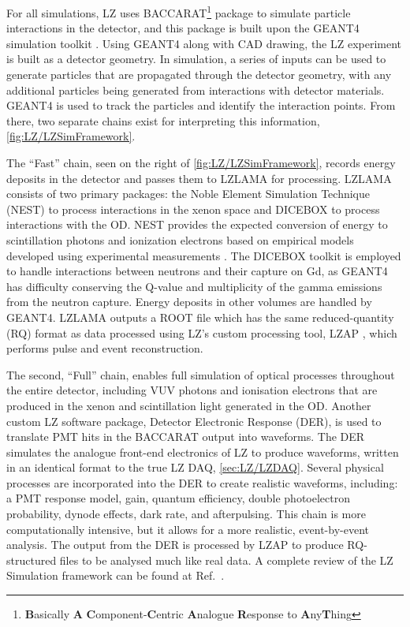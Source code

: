 For all simulations, LZ uses BACCARAT\footnote{\textbf{B}asically \textbf{A} \textbf{C}omponent-\textbf{C}entric \textbf{A}nalogue \textbf{R}esponse to \textbf{A}ny\textbf{T}hing}\cite{LZ_SIMS} package to simulate particle interactions in the detector, and this package is built upon the GEANT4 simulation toolkit \cite{GEANT4:2002zbu}. Using GEANT4 along with CAD drawing, the LZ experiment is built as a detector geometry. In simulation, a series of inputs can be used to generate particles that are propagated through the detector geometry, with any additional particles being generated from interactions with detector materials. GEANT4 is used to track the particles and identify the interaction points. From there, two separate chains exist for interpreting this information, \autoref{fig:LZ/LZSimFramework}.

The ``Fast'' chain, seen on the right of \autoref{fig:LZ/LZSimFramework}, records energy deposits in the detector and passes them to LZLAMA for processing. LZLAMA consists of two primary packages: the Noble Element Simulation Technique (NEST) to process interactions in the xenon space and DICEBOX to process interactions with the OD. NEST provides the expected conversion of energy to scintillation photons and ionization electrons based on empirical models developed using experimental measurements \cite{NEST1}. The DICEBOX toolkit is employed to handle interactions between neutrons and their capture on Gd, as GEANT4 has difficulty conserving the Q-value and multiplicity of the gamma emissions from the neutron capture. Energy deposits in other volumes are handled by GEANT4. LZLAMA outputs a ROOT file which has the same reduced-quantity (RQ) format as data processed using LZ's custom processing tool, LZAP \cite{LZ_SIMS}, which performs pulse and event reconstruction.

The second, ``Full'' chain, enables full simulation of optical processes throughout the entire detector, including VUV photons and ionisation electrons that are produced in the xenon and scintillation light generated in the OD. Another custom LZ software package, Detector Electronic Response (DER), is used to translate PMT hits in the BACCARAT output into waveforms. The DER simulates the analogue front-end electronics of LZ to produce waveforms, written in an identical format to the true LZ DAQ, \autoref{sec:LZ/LZDAQ}. Several physical processes are incorporated into the DER to create realistic waveforms, including: a PMT response model, gain, quantum efficiency, double photoelectron probability, dynode effects, dark rate, and afterpulsing. This chain is more computationally intensive, but it allows for a more realistic, event-by-event analysis. The output from the DER is processed by LZAP to produce RQ-structured files to be analysed much like real data.
A complete review of the LZ Simulation framework can be found at Ref.~\cite{LZ_SIMS}.

